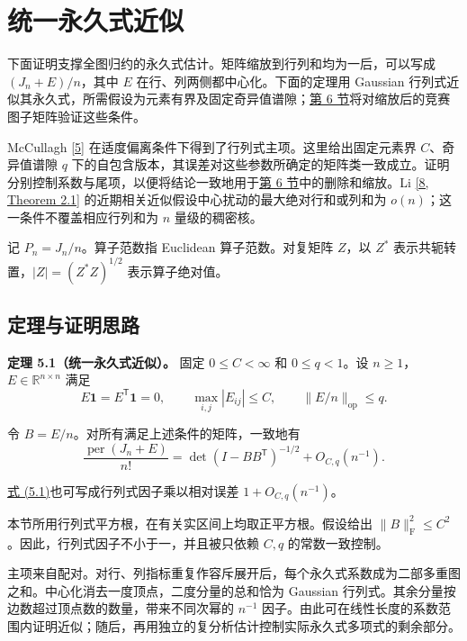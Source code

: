 \documentclass[11pt,a4paper]{article}
\makeatletter
\newcommand{\paperstatement}[3]{\par\addvspace{6pt}\Needspace{4\baselineskip}\phantomsection\def\@currentlabel{#2}\label{#3}\noindent\textbf{#1}\enspace}
\newcommand{\paperref}[2]{\hyperref[#1]{#2}}
\makeatother
\begin{document}
\section{统一永久式近似}\label{sec-5}

下面证明支撑全图归约的永久式估计。矩阵缩放到行列和均为一后，可以写成 \((J_n+E)/n\)，其中 \(E\) 在行、列两侧都中心化。下面的定理用 Gaussian 行列式近似其永久式，所需假设为元素有界及固定奇异值谱隙；\paperref{sec-6}{第 6 节}将对缩放后的竞赛图子矩阵验证这些条件。

McCullagh \paperref{bib-5}{[5]} 在适度偏离条件下得到了行列式主项。这里给出固定元素界 \(C\)、奇异值谱隙 \(q\) 下的自包含版本，其误差对这些参数所确定的矩阵类一致成立。证明分别控制系数与尾项，以便将结论一致地用于\paperref{sec-6}{第 6 节}中的删除和缩放。Li \paperref{bib-8}{[8, Theorem 2.1]} 的近期相关近似假设中心扰动的最大绝对行和或列和为 \(o(n)\)；这一条件不覆盖相应行列和为 \(n\) 量级的稠密核。

记 \(P_n=J_n/n\)。算子范数指 Euclidean 算子范数。对复矩阵 \(Z\)，以 \(Z^*\) 表示共轭转置，\(|Z|=(Z^*Z)^{1/2}\) 表示算子绝对值。

\subsection{定理与证明思路}\label{sec-5.1}

\paperstatement{定理 5.1（统一永久式近似）。}{5.1}{thm-5.1} 固定 \(0\le C<\infty\) 和 \(0\le q<1\)。设 \(n\ge1\)，\(E\in\mathbb R^{n\times n}\) 满足
\[E\mathbf1=E^{\mathsf T}\mathbf1=0,\qquad
\max_{i,j}|E_{ij}|\le C,\qquad
\|E/n\|_{\mathrm{op}}\le q.\]

令 \(B=E/n\)。对所有满足上述条件的矩阵，一致地有
\begin{equation}
\frac{\operatorname{per}(J_n+E)}{n!}
=\det(I-BB^{\mathsf T})^{-1/2}+O_{C,q}(n^{-1}).
\tag{5.1}\label{eq-uniform-permanent}
\end{equation}

\paperref{eq-uniform-permanent}{式 (5.1)}也可写成行列式因子乘以相对误差 \(1+O_{C,q}(n^{-1})\)。

本节所用行列式平方根，在有关实区间上均取正平方根。假设给出 \(\|B\|_{\mathrm F}^2\le C^2\)。因此，行列式因子不小于一，并且被只依赖 \(C,q\) 的常数一致控制。

主项来自配对。对行、列指标重复作容斥展开后，每个永久式系数成为二部多重图之和。中心化消去一度顶点，二度分量的总和恰为 Gaussian 行列式。其余分量按边数超过顶点数的数量，带来不同次幂的 \(n^{-1}\) 因子。由此可在线性长度的系数范围内证明近似；随后，再用独立的复分析估计控制实际永久式多项式的剩余部分。
\end{document}
